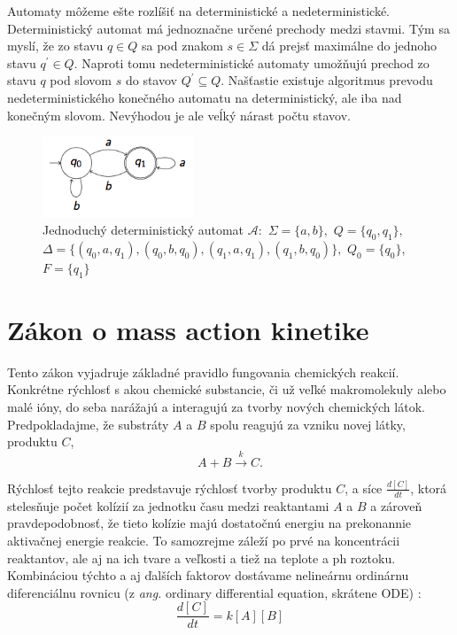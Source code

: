 \documentclass[11pt,final,oneside]{fithesis}
\begin{document}
Automaty m\^ o\v zeme e\v ste rozl\'i\v si\v t na deterministick\'e a nedeterministick\'e. Deterministick\' y automat m\'a jednozna\v cne ur\v cen\'e prechody 
medzi stavmi. T\'ym sa mysl\'i, \v ze zo stavu $q \in Q$ sa pod znakom $s \in \Sigma$ d\'a prejs\v t maxim\'alne do jednoho stavu $q^{'} \in Q$. Naproti tomu
nedeterministick\'e automaty umo\v z\v nuj\'u prechod zo stavu $q$ pod slovom $s$ do stavov $Q^{'} \subseteq Q$. Na\v s\v tastie existuje algoritmus prevodu 
nedeterministick\'eho kone\v cn\'eho automatu  na deterministick\'y, ale iba nad kone\v cn\'ym slovom. Nev\'yhodou je ale ve\'lk\'y n\'arast po\v ctu stavov.
\cite{Clarke:MC:BA}
\begin{figure}[h]
	\centering
	\includegraphics[width=0.4\textwidth]{buchi1}
	\caption{Jednoduch\'y deterministick\'y automat $\mathcal{A} :$ $\Sigma = \{a,b\},$ $Q = \{q_0,q_1\},$ $\Delta = \{(q_0,a,q_1),(q_0,b,q_0),(q_1,a,q_1),(q_1,b,q_0)\},$ 
	$Q_0 = \{q_0\}$, $F = \{q_1\}$}
	\label{fig:buchi}
\end{figure}

\section{Z\'akon o mass action kinetike}
\label{sec:massAction}
Tento z\'akon vyjadruje z\'akladn\'e pravidlo fungovania chemick\'ych reakci\'i. Konkr\'etne r\'ychlos\v t s akou chemick\'e substancie, \v ci u\v z 
ve\v lk\'e makromolekuly alebo mal\'e i\'ony, do seba nar\'a\v zaj\'u a interaguj\'u za tvorby nov\'ych chemick\'ych l\'atok. Predpokladajme, \v ze
substr\'aty $A$ a $B$ spolu reaguj\'u za vzniku novej l\'atky, produktu $C$,
\begin{equation}
\label{eq:simpleReaction}
A + B \overset{k}{\longrightarrow} C.
\end{equation}

R\'ychlos\v t tejto reakcie predstavuje r\'ychlos\v t tvorby produktu $C$, a s\'ice $\frac{d[C]}{dt}$, ktor\'a steles\v nuje po\v cet kol\'izi\'i za jednotku 
\v casu medzi reaktantami $A$ a $B$ a z\'arove\v n pravdepodobnos\v t, \v ze tieto kol\'izie maj\'u dostato\v cn\'u energiu na prekonannie aktiva\v cnej 
energie reakcie. To samozrejme z\'ale\v z\'i po prv\'e na koncentr\'acii reaktantov, ale aj na ich tvare a ve\v lkosti a tie\v z na teplote a ph roztoku. 
Kombin\'aciou t\'ychto a aj \v dal\v s\'ich faktorov dost\'avame neline\'arnu ordin\'arnu diferenci\'alnu rovnicu (z \textit{ang.} ordinary differential 
equation, skr\'atene ODE) \cite{ODE}:
\begin{equation}
\label{eq:differentialReaction}
\frac{d[C]}{dt} = k[A][B]
\end{equation}
\end{document}

